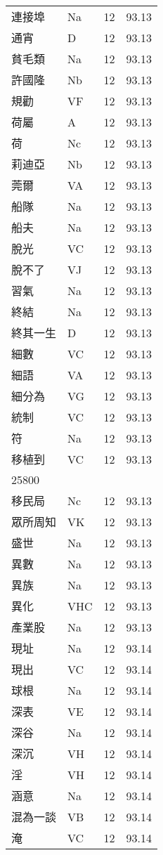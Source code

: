 \documentclass[twocolumn]{book}
\begin{document}
\begin{supertabular}{llrr}
連接埠 & Na & 12 &  93.13\\
通宵 & D & 12 &  93.13\\
貧毛類 & Na & 12 &  93.13\\
許國隆 & Nb & 12 &  93.13\\
規勸 & VF & 12 &  93.13\\
荷屬 & A & 12 &  93.13\\
荷 & Nc & 12 &  93.13\\
莉迪亞 & Nb & 12 &  93.13\\
莞爾 & VA & 12 &  93.13\\
船隊 & Na & 12 &  93.13\\
船夫 & Na & 12 &  93.13\\
脫光 & VC & 12 &  93.13\\
脫不了 & VJ & 12 &  93.13\\
習氣 & Na & 12 &  93.13\\
終結 & Na & 12 &  93.13\\
終其一生 & D & 12 &  93.13\\
細數 & VC & 12 &  93.13\\
細語 & VA & 12 &  93.13\\
細分為 & VG & 12 &  93.13\\
統制 & VC & 12 &  93.13\\
符 & Na & 12 &  93.13\\
移植到 & VC & 12 &  93.13\\
25800\\
移民局 & Nc & 12 &  93.13\\
眾所周知 & VK & 12 &  93.13\\
盛世 & Na & 12 &  93.13\\
異數 & Na & 12 &  93.13\\
異族 & Na & 12 &  93.13\\
異化 & VHC & 12 &  93.13\\
產業股 & Na & 12 &  93.13\\
現址 & Na & 12 &  93.14\\
現出 & VC & 12 &  93.14\\
球根 & Na & 12 &  93.14\\
深表 & VE & 12 &  93.14\\
深谷 & Na & 12 &  93.14\\
深沉 & VH & 12 &  93.14\\
淫 & VH & 12 &  93.14\\
涵意 & Na & 12 &  93.14\\
混為一談 & VB & 12 &  93.14\\
淹 & VC & 12 &  93.14\\

\end{supertabular}
\end{document}
